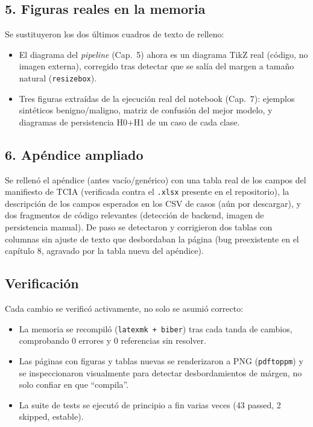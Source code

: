 \documentclass[11pt,a4paper]{article}
\begin{document}
\subsection*{5. Figuras reales en la memoria}
Se sustituyeron los dos últimos cuadros de texto de relleno:
\begin{itemize}[nosep]
  \item El diagrama del \textit{pipeline} (Cap.\ 5) ahora es un diagrama TikZ
        real (código, no imagen externa), corregido tras detectar que se
        salía del margen a tamaño natural (\texttt{resizebox}).
  \item Tres figuras extraídas de la ejecución real del notebook (Cap.\ 7):
        ejemplos sintéticos benigno/maligno, matriz de confusión del mejor
        modelo, y diagramas de persistencia H0+H1 de un caso de cada clase.
\end{itemize}

\subsection*{6. Apéndice ampliado}
Se rellenó el apéndice (antes vacío/genérico) con una tabla real de los
campos del manifiesto de TCIA (verificada contra el \texttt{.xlsx} presente en
el repositorio), la descripción de los campos esperados en los CSV de casos
(aún por descargar), y dos fragmentos de código relevantes (detección de
backend, imagen de persistencia manual). De paso se detectaron y corrigieron
dos tablas con columnas sin ajuste de texto que desbordaban la página (bug
preexistente en el capítulo 8, agravado por la tabla nueva del apéndice).

\subsection*{Verificación}
Cada cambio se verificó activamente, no solo se asumió correcto:
\begin{itemize}[nosep]
  \item La memoria se recompiló (\texttt{latexmk + biber}) tras cada tanda de
        cambios, comprobando 0 errores y 0 referencias sin resolver.
  \item Las páginas con figuras y tablas nuevas se renderizaron a PNG
        (\texttt{pdftoppm}) y se inspeccionaron visualmente para detectar
        desbordamientos de márgen, no solo confiar en que ``compila''.
  \item La suite de tests se ejecutó de principio a fin varias veces
        (43 passed, 2 skipped, estable).
\end{itemize}
\end{document}
